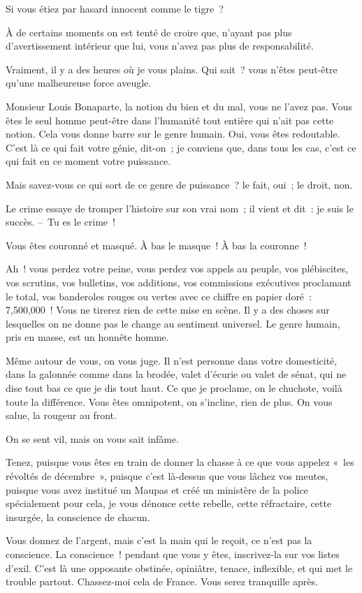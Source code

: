 \documentclass[french,twoside]{book} %
\begin{document}
Si vous étiez par hasard innocent comme le tigre ?\par
À de certains moments on est tenté de croire que, n’ayant pas plus d’avertissement intérieur que lui, vous n’avez pas plus de responsabilité.\par
Vraiment, il y a des heures où je vous plains. Qui sait ? vous n’êtes peut-être qu’une malheureuse force aveugle.\par
Monsieur Louis Bonaparte, la notion du bien et du mal, vous ne l’avez pas. Vous êtes le seul homme peut-être dans l’humanité tout entière qui n’ait pas cette notion. Cela vous donne barre sur le genre humain. Oui, vous êtes redoutable. C’est là ce qui fait votre génie, dit-on ; je conviens que, dans tous les cas, c’est ce qui fait en ce moment votre puissance.\par
Mais savez-vous ce qui sort de ce genre de puissance ? le fait, oui ; le droit, non.\par
Le crime essaye de tromper l’histoire sur son vrai nom ; il vient et dit : je suis le succès. – Tu es le crime !\par
Vous êtes couronné et masqué. À bas le masque ! À bas la couronne !\par
Ah ! vous perdez votre peine, vous perdez vos appels au peuple, vos plébiscites, vos scrutins, vos bulletins, vos additions, vos commissions exécutives proclamant le total, vos banderoles rouges ou vertes avec ce chiffre en papier doré : 7,500,000 ! Vous ne tirerez rien de cette mise en scène. Il y a des choses sur lesquelles on ne donne pas le change au sentiment universel. Le genre humain, pris en masse, est un honnête homme.\par
Même autour de vous, on vous juge. Il n’est personne dans votre domesticité, dans la galonnée comme dans la brodée, valet d’écurie ou valet de sénat, qui ne dise tout bas ce que je dis tout haut. Ce que je proclame, on le chuchote, voilà toute la différence. Vous êtes omnipotent, on s’incline, rien de plus. On vous salue, la rougeur au front.\par
On se sent vil, mais on vous sait infâme.\par
Tenez, puisque vous êtes en train de donner la chasse à ce que vous appelez « les révoltés de décembre », puisque c’est là-dessus que vous lâchez vos meutes, puisque vous avez institué un Maupas et créé un ministère de la police spécialement pour cela, je vous dénonce cette rebelle, cette réfractaire, cette insurgée, la conscience de chacun.\par
Vous donnez de l’argent, mais c’est la main qui le reçoit, ce n’est pas la conscience. La conscience ! pendant que vous y êtes, inscrivez-la sur vos listes d’exil. C’est là une opposante obstinée, opiniâtre, tenace, inflexible, et qui met le trouble partout. Chassez-moi cela de France. Vous serez tranquille après.\par
\end{document}
